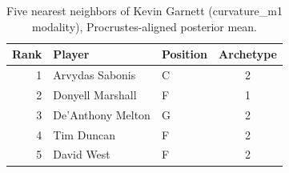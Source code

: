 \begin{table}[htbp]
  \centering\small
  \begin{tabular}{rllc}
    \toprule
    Rank & Player & Position & Archetype \\
    \midrule
    1 & Arvydas Sabonis & C & 2 \\
    2 & Donyell Marshall & F & 1 \\
    3 & De'Anthony Melton & G & 2 \\
    4 & Tim Duncan & F & 2 \\
    5 & David West & F & 2 \\
    \bottomrule
  \end{tabular}
  \caption{Five nearest neighbors of Kevin Garnett (curvature_m1 modality), Procrustes-aligned posterior mean.}
  \label{tab:Kevin_Garnett_neighbors_curvature_m1}
\end{table}

